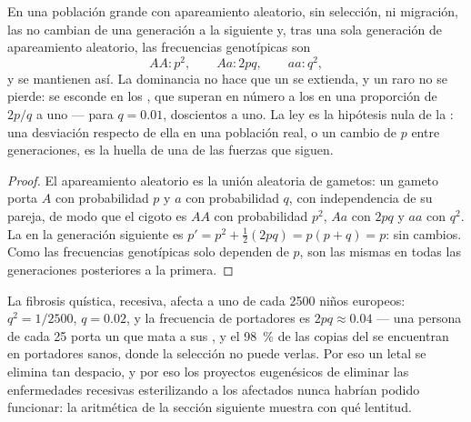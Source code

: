\begin{theorem}\label{thm:b2:population-genetics:hw}
En una población grande con apareamiento aleatorio, sin selección,
 ni migración, las  no cambian de una
generación a la siguiente y, tras una sola generación de apareamiento
aleatorio, las frecuencias genotípicas son
\[
AA : p^{2}, \qquad Aa : 2pq, \qquad aa : q^{2},
\]
y se mantienen así. La dominancia no hace que un   se
extienda, y un   raro no se pierde: se esconde en los
, que superan en número a los  en una proporción
de $2p/q$ a uno --- para $q = 0.01$, doscientos a uno. La ley es la
hipótesis nula de la : una desviación respecto de
ella en una población real, o un cambio de
$p$ entre generaciones, es la huella de una de las fuerzas que siguen.
\end{theorem}
\begin{proof}
El apareamiento aleatorio es la unión aleatoria de gametos: un gameto
porta $A$ con probabilidad $p$ y $a$ con probabilidad $q$, con
independencia de su pareja, de modo que el cigoto es $AA$ con probabilidad
$p^{2}$, $Aa$ con $2pq$ y $aa$ con $q^{2}$. La  en la
generación siguiente es $p' = p^{2} + \tfrac12(2pq) = p(p + q) = p$: sin
cambios. Como las frecuencias genotípicas solo dependen de $p$, son las
mismas en todas las generaciones posteriores a la primera.
\end{proof}

\begin{example}\label{ex:b2:population-genetics:cf}
La fibrosis quística, recesiva, afecta a uno de cada 2500 niños europeos:
$q^{2} = 1/2500$, $q = 0.02$, y la frecuencia de portadores es $2pq
\approx 0.04$ --- una persona de cada 25 porta un  que mata a sus
, y el \qty{98}{\%} de las copias del  se encuentran en
portadores sanos, donde la selección no puede verlas. Por eso un 
letal se elimina tan despacio, y por eso los proyectos eugenésicos de
eliminar las enfermedades recesivas esterilizando a los afectados nunca
habrían podido funcionar: la aritmética de la sección siguiente muestra
con qué lentitud.
\end{example}

